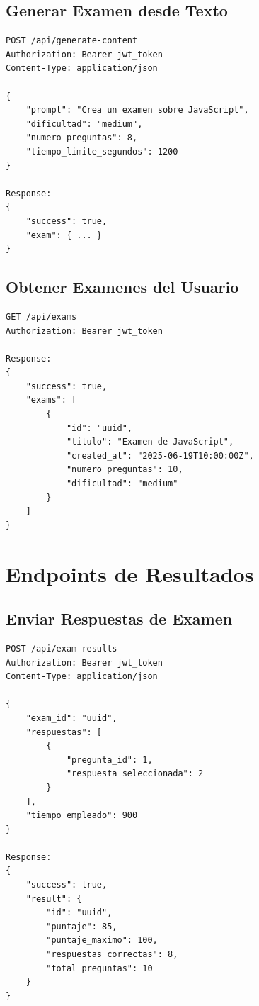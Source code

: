 \documentclass[12pt,a4paper]{report}
\begin{document}
\subsection{Generar Examen desde Texto}
\begin{lstlisting}
POST /api/generate-content
Authorization: Bearer jwt_token
Content-Type: application/json

{
    "prompt": "Crea un examen sobre JavaScript",
    "dificultad": "medium",
    "numero_preguntas": 8,
    "tiempo_limite_segundos": 1200
}

Response:
{
    "success": true,
    "exam": { ... }
}
\end{lstlisting}

\subsection{Obtener Examenes del Usuario}
\begin{lstlisting}
GET /api/exams
Authorization: Bearer jwt_token

Response:
{
    "success": true,
    "exams": [
        {
            "id": "uuid",
            "titulo": "Examen de JavaScript",
            "created_at": "2025-06-19T10:00:00Z",
            "numero_preguntas": 10,
            "dificultad": "medium"
        }
    ]
}
\end{lstlisting}

\section{Endpoints de Resultados}

\subsection{Enviar Respuestas de Examen}
\begin{lstlisting}
POST /api/exam-results
Authorization: Bearer jwt_token
Content-Type: application/json

{
    "exam_id": "uuid",
    "respuestas": [
        {
            "pregunta_id": 1,
            "respuesta_seleccionada": 2
        }
    ],
    "tiempo_empleado": 900
}

Response:
{
    "success": true,
    "result": {
        "id": "uuid",
        "puntaje": 85,
        "puntaje_maximo": 100,
        "respuestas_correctas": 8,
        "total_preguntas": 10
    }
}
\end{lstlisting}
\end{document}
